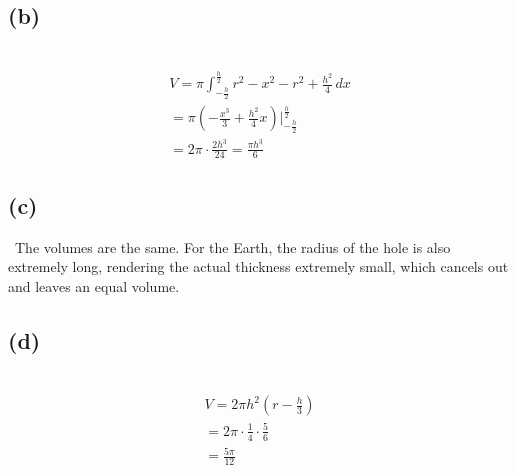 \documentclass[12pt]{article}
\newcommand{\vem}{\vspace{0.5em}}
\newcommand{\subproblem}[1]{\subsection{(#1)} \,}
\begin{document}
\subproblem{b}
\begin{gather*}
    V= \pi \int_{-\frac{h}{2}}^{\frac{h}{2}}  r^2-x^2-r^2+\frac{h^2}{4}\, dx\\
    = \pi ( - \frac{x^3}{3} +\frac{h^2}{4}x)\Big|_{-\frac{h}{2}}^{\frac{h}{2}} \\
    =2\pi\cdot \frac{2h^3}{24} = \boxed{\frac{\pi h^3}{6}}
\end{gather*}

\subproblem{c}
The volumes are the same. For the Earth, the radius of the hole is also extremely long, rendering the actual thickness extremely small, which cancels out and leaves an equal volume. \vem

\subproblem{d}
\begin{gather*}
    V=2\pi h^2(r-\frac{h}{3})\\
    =2\pi \cdot \frac{1}{4}\cdot \frac{5}{6}\\
    =\boxed{\frac{5\pi}{12}}
\end{gather*}
\end{document}
